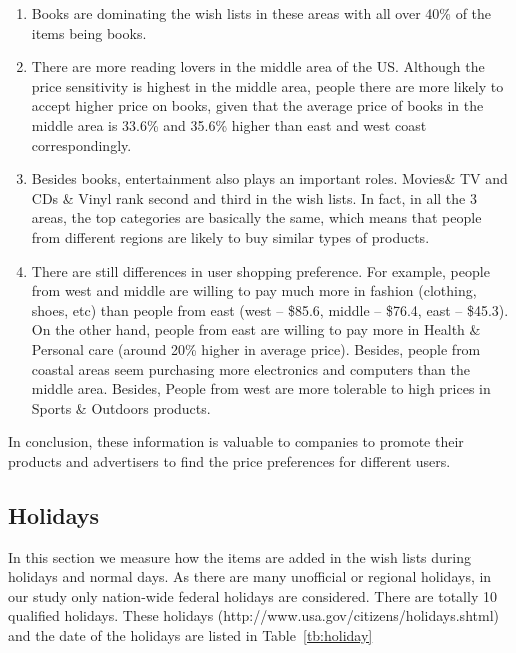 \documentclass{llncs}
\begin{document}
\begin{enumerate}
\item Books are dominating the wish lists in these areas with all over 40\% of the items being books.

\item There are more reading lovers in the middle area of the US. Although the price sensitivity is highest in the middle area, people there are more likely to accept higher price on books, given that the average price of books in the middle area is 33.6\% and 35.6\% higher than east and west coast correspondingly. 

\item Besides books, entertainment also plays an important roles. Movies\& TV and CDs \& Vinyl rank second and third in the wish lists. In fact, in all the 3 areas, the top categories are basically the same, which means that people from different regions are likely to buy similar types of products. 

\item There are still differences in user shopping preference. For example, people from west and middle are willing to pay much more in fashion (clothing, shoes, etc) than people from east (west -- \$85.6, middle -- \$76.4, east -- \$45.3). On the other hand, people from east are willing to pay more in Health \& Personal care (around 20\% higher in average price). Besides, people from coastal areas seem purchasing more electronics and computers than the middle area. Besides, People from west are more tolerable to high prices in Sports \& Outdoors products. 

\end{enumerate}
In conclusion, these information is valuable to companies to promote their products and advertisers to find the price preferences for different users. 

\subsection{Holidays}
In this section we measure how the items are added in the wish lists during holidays and normal days. As there are many unofficial or regional holidays, in our study only nation-wide federal holidays are considered. There are totally 10 qualified holidays. These holidays (http://www.usa.gov/citizens/holidays.shtml) and the date of the holidays are listed in Table~\ref{tb:holiday}
\end{document}
